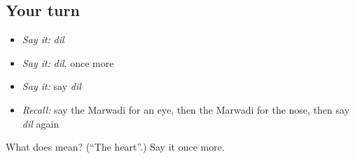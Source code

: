 \subsection*{Your turn}
\begin{itemize}
\raggedright
  \item \emph{Say it:} \emph{dil}
  \item \emph{Say it:} \emph{dil}, once more
  \item \emph{Say it:} say \emph{dil}
  \item \emph{Recall:} say the Marwadi for an eye, then the Marwadi for the nose, then say \emph{dil} again
\end{itemize}

\begin{tcolorbox}[breakable,colback=teal!4,colframe=teal!35!black,title={Before you move on}]
What does  mean? (\textquotedblleft{}The heart\textquotedblright{}.) Say it once more.
\end{tcolorbox}
